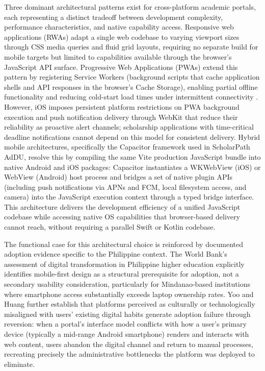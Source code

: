 Three dominant architectural patterns exist for cross-platform academic portals, each representing a distinct tradeoff between development complexity, performance characteristics, and native capability access. Responsive web applications (RWAs) adapt a single web codebase to varying viewport sizes through CSS media queries and fluid grid layouts, requiring no separate build for mobile targets but limited to capabilities available through the browser's JavaScript API surface. Progressive Web Applications (PWAs) extend this pattern by registering Service Workers (background scripts that cache application shells and API responses in the browser's Cache Storage), enabling partial offline functionality and reducing cold-start load times under intermittent connectivity \cite{ref33}. However, iOS imposes persistent platform restrictions on PWA background execution and push notification delivery through WebKit that reduce their reliability as proactive alert channels; scholarship applications with time-critical deadline notifications cannot depend on this model for consistent delivery. Hybrid mobile architectures, specifically the Capacitor framework used in ScholarPath AdDU, resolve this by compiling the same Vite production JavaScript bundle into native Android and iOS packages: Capacitor instantiates a WKWebView (iOS) or WebView (Android) host process and bridges a set of native plugin APIs (including push notifications via APNs and FCM, local filesystem access, and camera) into the JavaScript execution context through a typed bridge interface. This architecture delivers the development efficiency of a unified JavaScript codebase while accessing native OS capabilities that browser-based delivery cannot reach, without requiring a parallel Swift or Kotlin codebase.

The functional case for this architectural choice is reinforced by documented adoption evidence specific to the Philippine context. The World Bank's \cite{ref48} assessment of digital transformation in Philippine higher education explicitly identifies mobile-first design as a structural prerequisite for adoption, not a secondary usability consideration, particularly for Mindanao-based institutions where smartphone access substantially exceeds laptop ownership rates. Yoo and Huang \cite{ref49} further establish that platforms perceived as culturally or technologically misaligned with users' existing digital habits generate adoption failure through reversion: when a portal's interface model conflicts with how a user's primary device (typically a mid-range Android smartphone) renders and interacts with web content, users abandon the digital channel and return to manual processes, recreating precisely the administrative bottlenecks the platform was deployed to eliminate.

